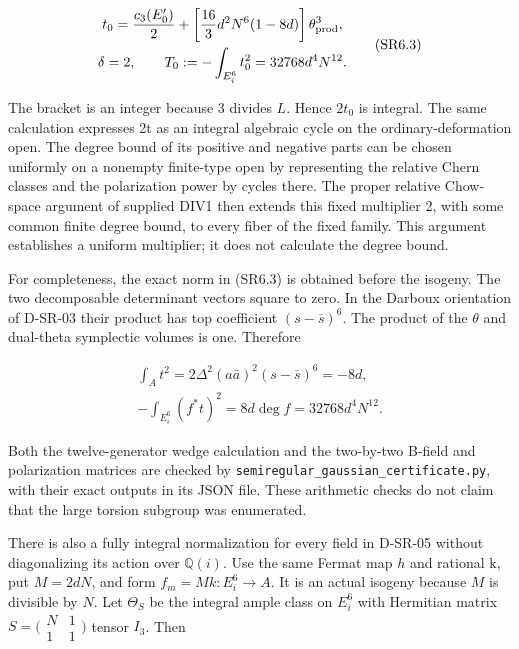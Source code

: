 \[
\begin{gathered}t_0=\frac{c_3(E_0^{\prime})}{2}+\left[\frac{16}{3}d^2N^6(1-8d)\right]\theta_{\rm prod}^3,\\\delta=2,\qquad T_0:=-\int_{E_i^6}t_0^2=32768d^4N^{12}.\end{gathered}\tag{SR6.3}
\]

The bracket is an integer because 3 divides \(L\). Hence \(2t_0\) is integral. The same calculation expresses 2t as an integral algebraic cycle on the ordinary-deformation open. The degree bound of its positive and negative parts can be chosen uniformly on a nonempty finite-type open by representing the relative Chern classes and the polarization power by cycles there. The proper relative Chow-space argument of supplied DIV1 then extends this fixed multiplier 2, with some common finite degree bound, to every fiber of the fixed family. This argument establishes a uniform multiplier; it does not calculate the degree bound.

For completeness, the exact norm in (SR6.3) is obtained before the isogeny. The two decomposable determinant vectors square to zero. In the Darboux orientation of D-SR-03 their product has top coefficient \((s-\bar s)^6\). The product of the \(\theta\) and dual-theta symplectic volumes is one. Therefore

\[
\begin{gathered}\int_A t^2=2\Delta^2(a\bar a)^2(s-\bar s)^6=-8d,\\-\int_{E_i^6}(f^*t)^2=8d\deg f=32768d^4N^{12}.\end{gathered}\tag{SR6.4}
\]

Both the twelve-generator wedge calculation and the two-by-two B-field and polarization matrices are checked by \texttt{semiregular\_gaussian\_certificate.py}, with their exact outputs in its JSON file. These arithmetic checks do not claim that the large torsion subgroup was enumerated.

There is also a fully integral normalization for every field in D-SR-05 without diagonalizing its action over \(\mathbb Q(i)\). Use the same Fermat map \(h\) and rational k, put \(M=2dN\), and form \(f_m=Mk:E_i^6\to A\). It is an actual isogeny because \(M\) is divisible by \(N\). Let \(\Theta_S\) be the integral ample class on \(E_i^6\) with Hermitian matrix \(S=\bigl(\begin{smallmatrix}N&1\\1&1\end{smallmatrix}\bigr)\) tensor \(I_3\). Then

